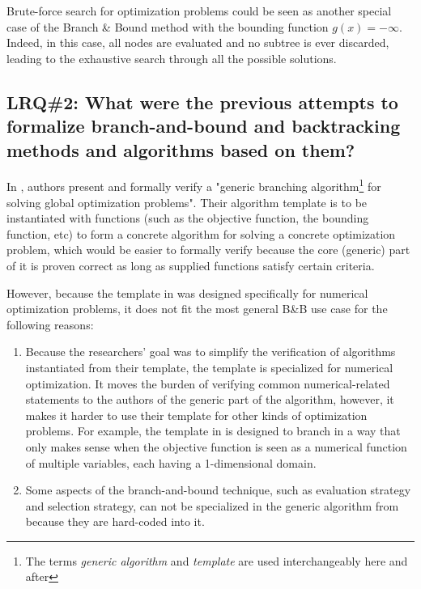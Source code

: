 Brute-force search for optimization problems could be seen as another special case of the
Branch \& Bound method with the bounding function $g(x) = -\infty$.
Indeed, in this case, all nodes are evaluated
and no subtree is ever discarded, leading to the exhaustive search through all the possible solutions.

\subsection{LRQ\#2: What were the previous attempts to formalize branch-and-bound and backtracking methods and algorithms based on them?}

In \cite{narkawicz2013formalnasa}, authors present and formally verify a "generic branching
algorithm\footnote{The terms \emph{generic algorithm} and \emph{template} are used interchangeably
                    here and after}
for solving global optimization problems". Their algorithm template is to be instantiated with
functions (such as the objective function, the bounding function, etc) to form a concrete
algorithm for solving a concrete optimization problem, which would be easier to formally verify
because the core (generic) part of it is proven correct as long as supplied functions
satisfy certain criteria.

However, because the template in \cite{narkawicz2013formalnasa} was designed specifically for
numerical optimization problems, it does not fit the most general B\&B use case for the following
reasons:

\begin{enumerate}
    \item Because the researchers' goal was to simplify the verification of algorithms instantiated
        from their template, the template is specialized for numerical optimization. It moves the
        burden of verifying common numerical-related statements to the authors of the generic
        part of the algorithm, however, it makes it harder to use their template for other kinds of
        optimization problems. For example, the template in \cite{narkawicz2013formalnasa}
        is designed to branch in a way that only makes sense when the objective function is seen as
        a numerical function of multiple variables, each having a 1-dimensional domain.
    \item Some aspects of the branch-and-bound technique, such as evaluation strategy
        and selection strategy, can not be specialized in the
        generic algorithm from \cite{narkawicz2013formalnasa} because they are hard-coded into it.
\end{enumerate}

